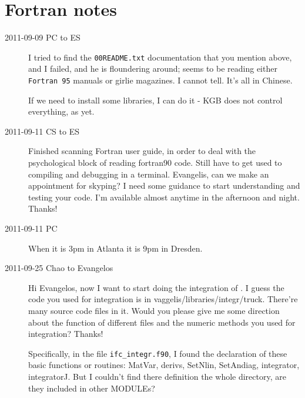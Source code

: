 \section{Fortran notes}
\label{s:fortran}

\begin{description}

\item[2011-09-09 PC to ES]
I tried to find the \texttt{00README.txt} documentation that you mention
above, and I failed, and he is floundering around; seems to be reading
either \texttt{Fortran 95} manuals or girlie magazines. I cannot tell.
It's all in Chinese.

If we need to install some libraries, I can do it - KGB does not control
everything, as yet.


\item[2011-09-11 CS to ES] Finished scanning Fortran user guide, in order
to deal with the psychological block of reading fortran90 code. Still
have to get used to compiling and debugging in a terminal. Evangelis, can
we make an appointment for skyping? I need some guidance to start
understanding and testing your code. I'm available almost anytime in the
afternoon and night. Thanks!

\item[2011-09-11 PC] When it is 3pm in Atlanta it is 9pm in Dresden.

\item[2011-09-25 Chao to Evangelos]
Hi Evangelos, now I want to start doing the integration of \KSe. I guess the code you used for integration is in vaggelis/libraries/integr/truck. There're many source code files in it. Would you please give me some direction about the function of different files and the numeric methods you used for integration? Thanks!

Specifically, in the file \texttt{ifc\_integr.f90}, I found the declaration of these basic functions or routines: MatVar, derivs, SetNlin, SetAndiag, integrator, integratorJ. But I couldn't find there definition the whole directory, are they included in other MODULEs?

\end{description}
